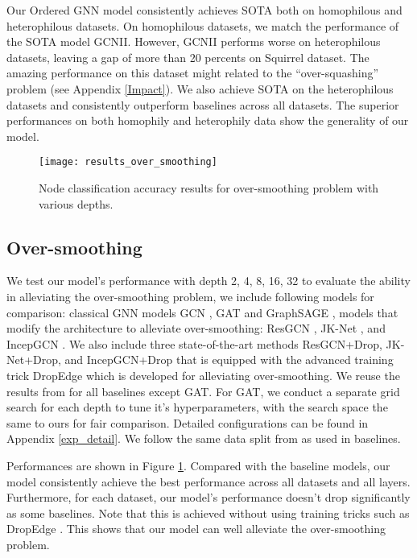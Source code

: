 \documentclass{article}
\begin{document}
Our Ordered GNN model consistently achieves SOTA both on homophilous and heterophilous datasets. On homophilous datasets, we match the performance of the SOTA model GCNII. However, GCNII performs worse on heterophilous datasets, leaving a gap of more than 20 percents on Squirrel dataset. The amazing performance on this dataset might related to the ``over-squashing'' problem \citep{alon2020bottleneck,topping2021understanding} (see Appendix \ref{Impact}). We also achieve SOTA on the heterophilous datasets and consistently outperform baselines across all datasets. The superior performances on both homophily and heterophily data show the generality of our model.


\begin{figure}\centering
\texttt{[image: results\_over\_smoothing]}
\caption{Node classification accuracy results for over-smoothing problem with various depths.}
\label{fig.results_over_smoothing}
\end{figure}

\subsection{Over-smoothing}
\label{setting_smooth}
We test our model's performance with depth 2, 4, 8, 16, 32 to evaluate the ability in alleviating the over-smoothing problem, we include following models for comparison: classical GNN models GCN \citep{kipf2016semi}, GAT \citep{velivckovic2017graph} and GraphSAGE \citep{hamilton2017inductive}, models that modify the architecture to alleviate over-smoothing: ResGCN \citep{li2019deepgcns}, JK-Net \citep{xu2018representation}, and IncepGCN \citep{rong2019dropedge}. We also include three state-of-the-art methods ResGCN+Drop, JK-Net+Drop, and IncepGCN+Drop that is equipped with the advanced training trick DropEdge \citep{rong2019dropedge} which is developed for alleviating over-smoothing. We reuse the results from \citet{rong2019dropedge} for all baselines except GAT. For GAT, we conduct a separate grid search for each depth to tune it's hyperparameters, with the search space the same to ours for fair comparison. Detailed configurations can be found in Appendix \ref{exp_detail}. We follow the same data split from \citet{rong2019dropedge} as used in baselines.

Performances are shown in Figure \ref{fig.results_over_smoothing}. Compared with the baseline models, our model consistently achieve the best performance across all datasets and all layers. Furthermore, for each dataset, our model's performance doesn't drop significantly as some baselines. Note that this is achieved without using training tricks such as DropEdge \citep{rong2019dropedge}. This shows that our model can well alleviate the over-smoothing problem.
\end{document}
